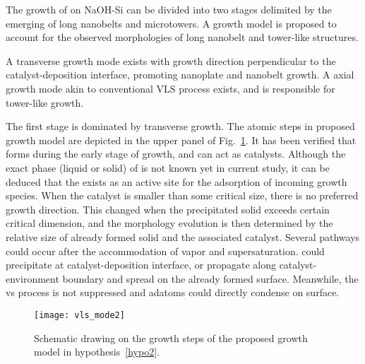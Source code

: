 The growth of  on NaOH-Si can be divided into two stages delimited by the emerging of long nanobelts and microtowers. A growth model is proposed to account for the observed morphologies of  long nanobelt and tower-like structures. 
\begin{hypothesis}\label{hypo2}
A transverse growth mode exists with growth direction perpendicular to the catalyst-deposition interface, promoting  nanoplate and nanobelt growth. A axial growth mode akin to conventional VLS process exists, and is responsible for  tower-like growth.  
\end{hypothesis}

The first stage is dominated by transverse growth. The atomic steps in proposed growth model are depicted in the upper panel of Fig.~\ref{fig:ch4vls}. It has been verified that  forms during the early stage of growth, and can act as catalysts. Although the exact phase (liquid or solid) of  is not known yet in current study, it can be deduced that the  exists as an active site for the adsorption of incoming  growth species. When the catalyst is smaller than some critical size, there is no preferred growth direction. This changed when the precipitated solid exceeds certain critical dimension, and the morphology evolution is then determined by the relative size of already formed solid and the associated catalyst. Several pathways could occur after the accommodation of  vapor and supersaturation.  could precipitate at catalyst-deposition interface, or propagate along catalyst-environment boundary and spread on the already formed  surface. Meanwhile, the \gls{vs} process is not suppressed and  adatoms could directly condense on  surface.

\begin{figure}[htb]
\centering
\texttt{[image: vls\_mode2]}
\caption[Growth model of ]{Schematic drawing on the growth steps of the proposed growth model in hypothesis~\ref{hypo2}.}
\label{fig:ch4vls}
\end{figure}


